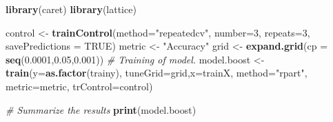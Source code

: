 \documentclass[
]{article}
\newenvironment{Shaded}{\begin{snugshade}}{\end{snugshade}}
\newcommand{\CommentTok}[1]{\textcolor[rgb]{0.56,0.35,0.01}{\textit{#1}}}
\newcommand{\DataTypeTok}[1]{\textcolor[rgb]{0.13,0.29,0.53}{#1}}
\newcommand{\DecValTok}[1]{\textcolor[rgb]{0.00,0.00,0.81}{#1}}
\newcommand{\FloatTok}[1]{\textcolor[rgb]{0.00,0.00,0.81}{#1}}
\newcommand{\KeywordTok}[1]{\textcolor[rgb]{0.13,0.29,0.53}{\textbf{#1}}}
\newcommand{\NormalTok}[1]{#1}
\newcommand{\OtherTok}[1]{\textcolor[rgb]{0.56,0.35,0.01}{#1}}
\newcommand{\StringTok}[1]{\textcolor[rgb]{0.31,0.60,0.02}{#1}}
\begin{document}
\begin{Shaded}
\begin{Highlighting}[]
\KeywordTok{library}\NormalTok{(caret)}
\KeywordTok{library}\NormalTok{(lattice)}

\NormalTok{control <-}\StringTok{  }\KeywordTok{trainControl}\NormalTok{(}\DataTypeTok{method=}\StringTok{"repeatedcv"}\NormalTok{,}
                         \DataTypeTok{number=}\DecValTok{3}\NormalTok{,}
                         \DataTypeTok{repeats=}\DecValTok{3}\NormalTok{,}
                         \DataTypeTok{savePredictions =} \OtherTok{TRUE}\NormalTok{)}
\NormalTok{metric <-}\StringTok{ "Accuracy"}
\NormalTok{grid <-}\StringTok{ }\KeywordTok{expand.grid}\NormalTok{(}\DataTypeTok{cp =} \KeywordTok{seq}\NormalTok{(}\FloatTok{0.0001}\NormalTok{,}\FloatTok{0.05}\NormalTok{,}\FloatTok{0.001}\NormalTok{))}
\CommentTok{# Training of model.}
\NormalTok{model.boost <-}\StringTok{ }\KeywordTok{train}\NormalTok{(}\DataTypeTok{y=}\KeywordTok{as.factor}\NormalTok{(trainy),}
                     \DataTypeTok{tuneGrid=}\NormalTok{grid,}\DataTypeTok{x=}\NormalTok{trainX,}
                     \DataTypeTok{method=}\StringTok{"rpart"}\NormalTok{,}
                     \DataTypeTok{metric=}\NormalTok{metric,}
                     \DataTypeTok{trControl=}\NormalTok{control)}

\CommentTok{# Summarize the results}
\KeywordTok{print}\NormalTok{(model.boost)}
\end{Highlighting}
\end{Shaded}
\end{document}
